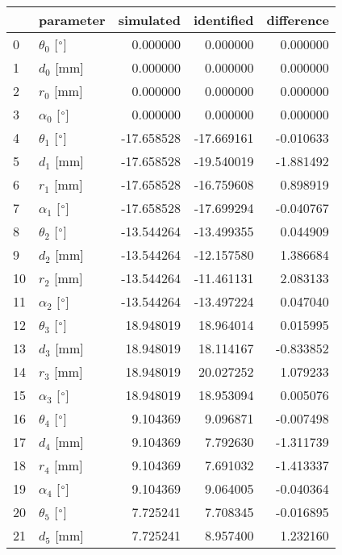 \documentclass{standalone}%
\begin{document}
%
\normalsize%
\begin{tabular}{llrrr}
\toprule
{} &                 parameter &  simulated & identified & difference \\
\midrule
0  &  $\theta_{0}$ [$\degree$] &   0.000000 &   0.000000 &   0.000000 \\
1  &              $d_{0}$ [mm] &   0.000000 &   0.000000 &   0.000000 \\
2  &              $r_{0}$ [mm] &   0.000000 &   0.000000 &   0.000000 \\
3  &  $\alpha_{0}$ [$\degree$] &   0.000000 &   0.000000 &   0.000000 \\
4  &  $\theta_{1}$ [$\degree$] & -17.658528 & -17.669161 &  -0.010633 \\
5  &              $d_{1}$ [mm] & -17.658528 & -19.540019 &  -1.881492 \\
6  &              $r_{1}$ [mm] & -17.658528 & -16.759608 &   0.898919 \\
7  &  $\alpha_{1}$ [$\degree$] & -17.658528 & -17.699294 &  -0.040767 \\
8  &  $\theta_{2}$ [$\degree$] & -13.544264 & -13.499355 &   0.044909 \\
9  &              $d_{2}$ [mm] & -13.544264 & -12.157580 &   1.386684 \\
10 &              $r_{2}$ [mm] & -13.544264 & -11.461131 &   2.083133 \\
11 &  $\alpha_{2}$ [$\degree$] & -13.544264 & -13.497224 &   0.047040 \\
12 &  $\theta_{3}$ [$\degree$] &  18.948019 &  18.964014 &   0.015995 \\
13 &              $d_{3}$ [mm] &  18.948019 &  18.114167 &  -0.833852 \\
14 &              $r_{3}$ [mm] &  18.948019 &  20.027252 &   1.079233 \\
15 &  $\alpha_{3}$ [$\degree$] &  18.948019 &  18.953094 &   0.005076 \\
16 &  $\theta_{4}$ [$\degree$] &   9.104369 &   9.096871 &  -0.007498 \\
17 &              $d_{4}$ [mm] &   9.104369 &   7.792630 &  -1.311739 \\
18 &              $r_{4}$ [mm] &   9.104369 &   7.691032 &  -1.413337 \\
19 &  $\alpha_{4}$ [$\degree$] &   9.104369 &   9.064005 &  -0.040364 \\
20 &  $\theta_{5}$ [$\degree$] &   7.725241 &   7.708345 &  -0.016895 \\
21 &              $d_{5}$ [mm] &   7.725241 &   8.957400 &   1.232160 \\

\end{tabular}
\end{document}
